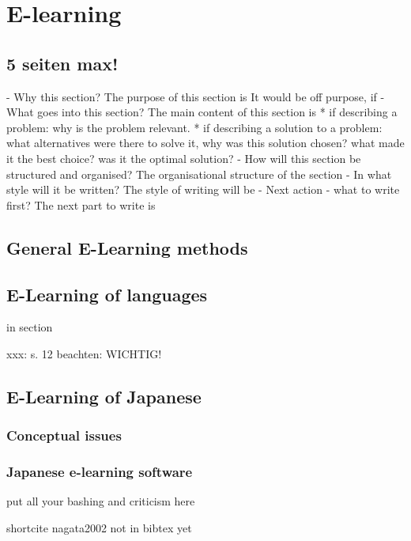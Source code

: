 \chapter{E-learning}
\label{chap:elearning}

\section{5 seiten max!}


- Why this section? 
  The purpose of this section is 
  It would be off purpose, if 
- What goes into this section?
  The main content of this section is 
  * if describing a problem: why is the problem relevant.
  * if describing a solution to a problem: what alternatives were
    there to solve it, why was this solution chosen? 
    what made it the best choice? was it the optimal solution?
- How will this section be structured and organised?
  The organisational structure of the section 
- In what style will it be written?
  The style of writing will be 
- Next action - what to write first?
  The next part to write is

\section{General E-Learning methods}
\section{E-Learning of languages}


in section 

xxx: s. 12 beachten: WICHTIG!

\section{E-Learning of Japanese}
\subsection{Conceptual issues}
\subsection{Japanese e-learning software}
put all your bashing and criticism here


shortcite nagata2002 not in bibtex yet

